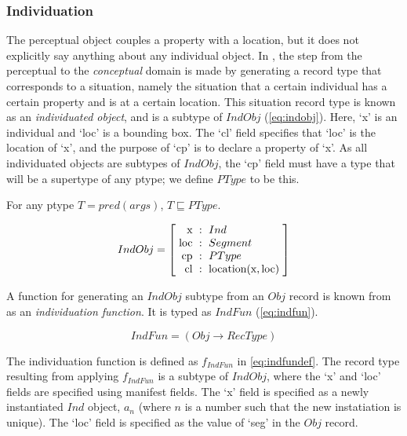 \subsubsection{Individuation}

The perceptual object couples a property with a location, but it does not explicitly say anything about any individual object.
In \cite{lspc}, the step from the perceptual to the \textit{conceptual} domain is made by generating a record type that corresponds to a situation, namely the situation that a certain individual has a certain property and is at a certain location.
This situation record type is known as an \textit{individuated object}, and is a subtype of $IndObj$ (\autoref{eq:indobj}).
Here, `x' is an individual and `loc' is a bounding box.
The `cl' field specifies that `loc' is the location of `x', and the purpose of `cp' is to declare a property of `x'.
As all individuated objects are subtypes of $IndObj$, the `cp' field must have a type that will be a supertype of any ptype; we define $PType$ to be this.

\begin{definition}
For any ptype $T = \mathit{pred}(\mathit{args})$, $T \sqsubseteq PType$.
\end{definition}

\begin{equation}\label{eq:indobj}
IndObj = \rec{
\text{x} &:& Ind \\
\text{loc} &:& Segment \\
\text{cp} &:& PType \\
\text{cl} &:& \text{location}(\text{x}, \text{loc}) \\
}
\end{equation}

A function for generating an $IndObj$ subtype from an $Obj$ record is known from \cite{lspc} as an \textit{individuation function}.
It is typed as $IndFun$ (\autoref{eq:indfun}).

\begin{equation}\label{eq:indfun}
IndFun = ( Obj \rightarrow RecType )
\end{equation}

The individuation function is defined as $f_{IndFun}$ in \autoref{eq:indfundef}.
The record type resulting from applying $f_{IndFun}$ is a subtype of $IndObj$, where the `x' and `loc' fields are specified using manifest fields.
The `x' field is specified as a newly instantiated $Ind$ object, $a_n$ (where $n$ is a number such that the new instatiation is unique).
The `loc' field is specified as the value of `seg' in the $Obj$ record.

